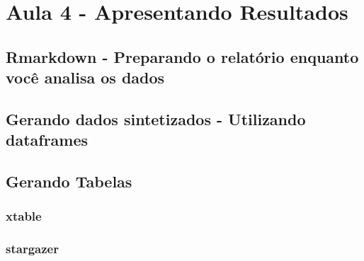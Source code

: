 \chapter{Aula 4 - Apresentando Resultados}

\section{Rmarkdown - Preparando o relatório enquanto você analisa os dados}

\section{Gerando dados sintetizados - Utilizando dataframes}

\section{Gerando Tabelas}

\subsection{xtable}

\subsection{stargazer}
